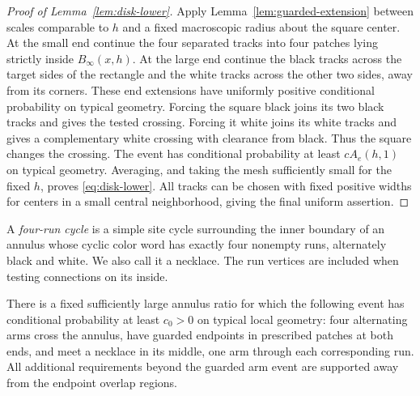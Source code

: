 \begin{proof}[Proof of Lemma~\ref{lem:disk-lower}]
Apply Lemma~\ref{lem:guarded-extension} between scales comparable to $h$
and a fixed macroscopic radius about the square center.  At the small
end continue the four separated tracks into four patches lying strictly
inside $B_\infty(x,h)$.  At the large end continue the black tracks across
the target sides of the rectangle and the white tracks across the other
two sides, away from its corners.  These end extensions have uniformly
positive conditional probability on typical geometry.  Forcing the square
black joins its two black tracks and gives the tested crossing.  Forcing
it white joins its white tracks and gives a complementary white crossing
with clearance from black.  Thus the square changes the crossing.
The event has conditional probability at least $cA_e(h,1)$ on typical
geometry.  Averaging, and taking the mesh sufficiently small for the
fixed $h$, proves \eqref{eq:disk-lower}.  All tracks can be chosen with
fixed positive widths for centers in a small central neighborhood, giving
the final uniform assertion.
\end{proof}

A \emph{four-run cycle} is a simple site cycle surrounding the inner
boundary of an annulus whose cyclic color word has exactly four nonempty
runs, alternately black and white.  We also call it a necklace.  The
run vertices are included when testing connections on its inside.

\begin{lemma}
\label{lem:necklace-sleeve}
There is a fixed sufficiently large annulus ratio for which the following
event has conditional probability at least $c_0>0$ on typical local
geometry: four alternating arms cross the annulus, have guarded endpoints
in prescribed patches at both ends, and meet a necklace in its middle,
one arm through each corresponding run.  All additional requirements
beyond the guarded arm event are supported away from the endpoint overlap
regions.
\end{lemma}

